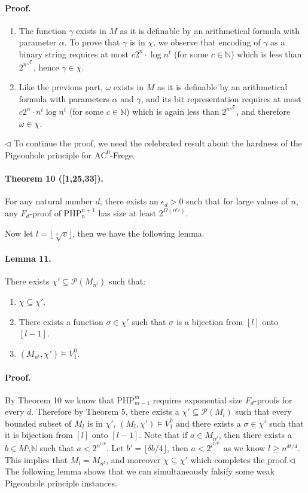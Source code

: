 \documentclass[10pt,a4paper]{article}
\begin{document}
\paragraph{Proof.}
\begin{enumerate}
\item The function $\gamma$ exists in $M$ as it is definable by an arithmetical formula with parameter $\alpha$. To prove that $\gamma$ is in $\chi$, we observe that encoding of $\gamma$ as a binary string requires at most $c2^n\cdot\log n^t$ (for some $c\in\mathbb N$) which is less than $2^{n^{\sqrt t}}$, hence $\gamma\in\chi$.
\item Like the previous part, $\omega$ exists in $M$ as it is definable by an arithmetical formula with parameters $\alpha$ and $\gamma$, and its bit representation requires at most $c2^n\cdot n^t\log n^t$ (for some $c\in\mathbb N$) which is again less than $2^{n^{\sqrt t}}$, and therefore $\omega\in\chi$.
\end{enumerate}\hfill$\triangleleft$
To continue the proof, we need the celebrated result about the hardness of the Pigeonhole principle for $\mathrm{AC}^0$-Frege.
\paragraph{Theorem 10 ([1,25,33]).} For any natural number $d$, there exists an $\epsilon_d>0$ such that for large values of $n$, any $F_d$-proof of $\mathrm{PHP}_n^{n+1}$ has size at least $2^{\Omega(n^{\epsilon_d})}$.

Now let $l=\lfloor\sqrt[4]v\rfloor$, then we have the following lemma.
\paragraph{Lemma 11.} There exists $\chi'\subseteq\mathcal P(M_{n^t})$ such that:
\begin{enumerate}
\item $\chi\subseteq\chi'$.
\item There exists a function $\sigma\in\chi'$ such that $\sigma$ is a bijection from $[l]$ onto $[l-1]$.
\item $(M_{n^t},\chi')\models V_1^0$.
\end{enumerate}
\paragraph{Proof.} By Theorem 10 we know that $\mathrm{PHP}_{m-1}^m$ requires exponential size $F_d$-proofs for every $d$. Therefore by Theorem 5, there exists a $\chi'\subseteq\mathcal P(M_l)$ such that every bounded subset of $M_l$ is in $\chi'$, $(M_l,\chi')\models V_1^0$ and there exists a $\sigma\in\chi'$ such that it is bijection from $[l]$ onto $[l-1]$.
Note that if $a\in M_{n^t}$, then there exists a $b\in M\setminus\mathbb N$ such that $a<2^{n^{t/b}}$. Let $b'=\lfloor\delta b/4\rfloor$, then $a<2^{l^{1/b'}}$ as we know $l\geq n^{\delta t/4}$. This implies that $M_l=M_{n^t}$, and moreover $\chi\subseteq\chi'$ which completes the proof.\hfill$\triangleleft$
The following lemma shows that we can simultaneously falsify some weak Pigeonhole principle instances.
\end{document}
